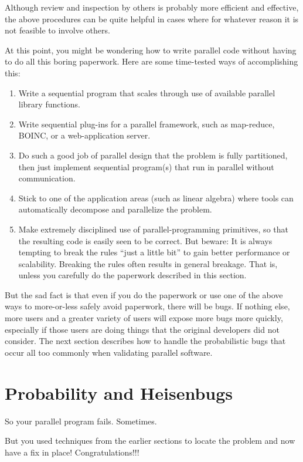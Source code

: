 Although review and inspection by others is probably more efficient and
effective, the above procedures can be quite helpful in cases where
for whatever reason it is not feasible to involve others.

At this point, you might be wondering how to write parallel code without
having to do all this boring paperwork.
Here are some time-tested ways of accomplishing this:

\begin{enumerate}
\item	Write a sequential program that scales through use of
	available parallel library functions.
\item	Write sequential plug-ins for a parallel framework,
	such as map-reduce, BOINC, or a web-application server.
\item	Do such a good job of parallel design that the problem
	is fully partitioned, then just implement sequential
	program(s) that run in parallel without communication.
\item	Stick to one of the application areas (such as linear algebra)
	where tools can automatically decompose and parallelize
	the problem.
\item	Make extremely disciplined use of parallel-programming
	primitives, so that the resulting code is easily seen to be correct.
	But beware: It is always tempting to break the rules
	``just a little bit'' to gain better performance or
	scalability.
	Breaking the rules often results in general breakage.
	That is, unless you carefully do the paperwork described in this
	section.
\end{enumerate}

But the sad fact is that even if you do the paperwork or use one of
the above ways to more-or-less safely avoid paperwork,
there will be bugs.
If nothing else, more users and a greater variety of users will expose
more bugs more quickly, especially if those users are doing things
that the original developers did not consider.
The next section describes how to handle the probabilistic bugs that
occur all too commonly when validating parallel software.

\section{Probability and Heisenbugs}
\label{sec:debugging:Probability and Heisenbugs}

So your parallel program fails.
Sometimes.

But you used techniques from the earlier sections to locate
the problem and now have a fix in place!
Congratulations!!!

